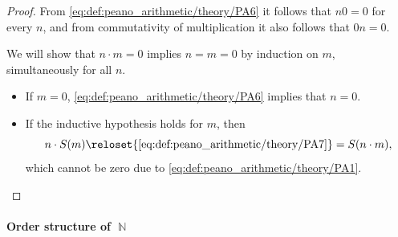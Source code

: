 \begin{proof}
   From \eqref{eq:def:peano_arithmetic/theory/PA6} it follows that \( n0 = 0 \) for every \( n \), and from commutativity of multiplication it also follows that \( 0n = 0 \).

   We will show that \( n \cdot m = 0 \) implies \( n = m = 0 \) by induction on \( m \), simultaneously for all \( n \).
  \begin{itemize}
    \item If \( m = 0 \), \eqref{eq:def:peano_arithmetic/theory/PA6} implies that \( n = 0 \).
    \item If the inductive hypothesis holds for \( m \), then
    \begin{equation*}
      n \cdot S(m)
      \reloset {\eqref{eq:def:peano_arithmetic/theory/PA7}} =
      S(n \cdot m),
    \end{equation*}
    which cannot be zero due to \eqref{eq:def:peano_arithmetic/theory/PA1}.
  \end{itemize}
\end{proof}

\paragraph{Order structure of \( \BbbN \)}

